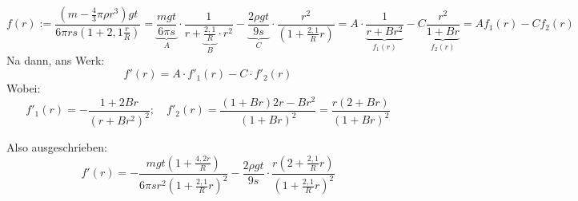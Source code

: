 \documentclass{article}
\begin{document}
\[
f(r) := \frac{(m- \frac{4}{3} \pi \rho r^3) gt}{6 \pi rs(1 + 2,1\frac{r}{R})} = \underbrace{ \frac{mgt}{6 \pi s} }_A \cdot \frac{1}{r+ \underbrace{ \frac{2,1}{R} }_B \cdot r^2} - \underbrace{ \frac{ 2 \rho gt}{9s} }_C \cdot \frac{r^2}{(1+ \frac{2,1}{R}r)} = A \cdot \underbrace{ \frac{1}{r + Br^2} }_{f_1(r)} - C \underbrace{ \frac{r^2}{1+Br} }_{f_2(r)} = Af_1(r) - Cf_2(r)
\]
Na dann, ans Werk:
\[
f'(r) = A\cdot f'_1(r) - C \cdot f'_2(r)
\]
Wobei:
\[
f'_1(r) = - \frac{1 + 2Br}{(r+Br^2)^2}; \quad f'_2(r) = \frac{(1+Br)2r - Br^2}{(1+Br)^2} = \frac{r(2+Br)}{(1+Br)^2}
\]

Also ausgeschrieben:
\[
f'(r) = - \frac{mgt(1+ \frac{4,2r}{R})}{6 \pi s r^2 (1+ \frac{2,1}{R}r)^2} - \frac{ 2 \rho gt}{9s} \cdot \frac{r(2+ \frac{2,1}{R}r) }{ (1+ \frac{2,1}{R}r)^2} 
\]
\\
\end{document}
